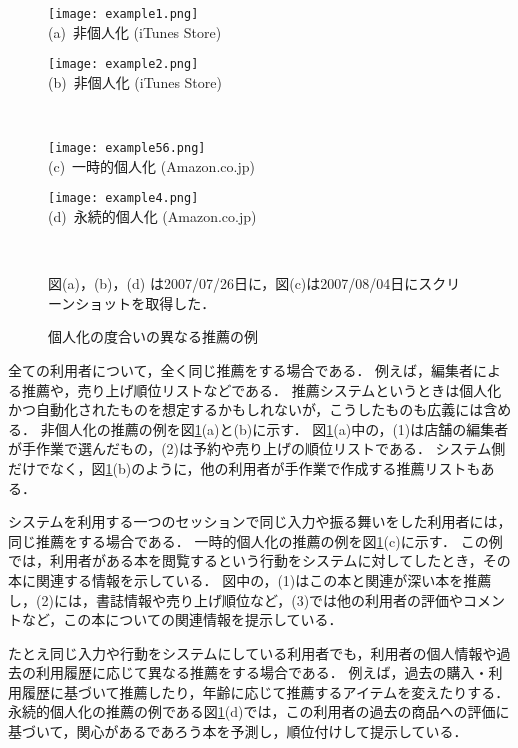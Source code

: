 \begin{figure}
\centering
\begin{minipage}{0.45\fullwidth}
\centering
\texttt{[image: example1.png]}\\
(a)~非個人化 (iTunes Store)
\end{minipage}
\hspace{0.02\fullwidth}
\begin{minipage}{0.45\fullwidth}
\centering
\texttt{[image: example2.png]}\\
(b)~非個人化 (iTunes Store)
\end{minipage}
\medskip\\
\begin{minipage}[b]{0.45\fullwidth}
\centering
\texttt{[image: example56.png]}\\
(c)~一時的個人化 (Amazon.co.jp)
\end{minipage}
\hspace{0.02\fullwidth}
\begin{minipage}[b]{0.45\fullwidth}
\centering
\texttt{[image: example4.png]}\\
(d)~永続的個人化 (Amazon.co.jp)
\end{minipage}
\bigskip\\
\caption{個人化の度合いの異なる推薦の例}
\label{fig:plevel}
{\footnotesize 図(a)，(b)，(d) は2007/07/26日に，図(c)は2007/08/04日にスクリーンショットを取得した．}
\end{figure}

\begin{description}[style=nextline]
\item[\term{非個人化}{no personalization}]
全ての利用者について，全く同じ推薦をする場合である．
例えば，編集者による推薦や，売り上げ順位リストなどである．
推薦システムというときは個人化かつ自動化されたものを想定するかもしれないが，こうしたものも広義には含める．
非個人化の推薦の例を図\ref{fig:plevel}(a)と(b)に示す．
図\ref{fig:plevel}(a)中の，(1)は店舗の編集者が手作業で選んだもの，(2)は予約や売り上げの順位リストである．
システム側だけでなく，図\ref{fig:plevel}(b)のように，他の利用者が手作業で作成する推薦リストもある．
\item[\term{一時的個人化}{ephemeral personalization}]
システムを利用する一つのセッションで同じ入力や振る舞いをした利用者には，同じ推薦をする場合である．
一時的個人化の推薦の例を図\ref{fig:plevel}(c)に示す．
この例では，利用者がある本を閲覧するという行動をシステムに対してしたとき，その本に関連する情報を示している．
図中の，(1)はこの本と関連が深い本を推薦し，(2)には，書誌情報や売り上げ順位など，(3)では他の利用者の評価やコメントなど，この本についての関連情報を提示している．
\item[\term{永続的個人化}{persistent personalization}]
たとえ同じ入力や行動をシステムにしている利用者でも，利用者の個人情報や過去の利用履歴に応じて異なる推薦をする場合である．
例えば，過去の購入・利用履歴に基づいて推薦したり，年齢に応じて推薦するアイテムを変えたりする．
永続的個人化の推薦の例である図\ref{fig:plevel}(d)では，この利用者の過去の商品への評価に基づいて，関心があるであろう本を予測し，順位付けして提示している．
\end{description}

